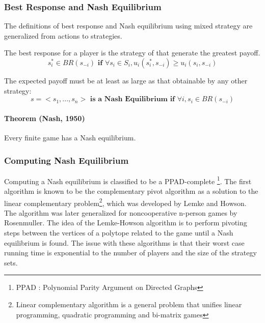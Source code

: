 \subsubsection{Best Response and Nash Equilibrium}The definitions of best response and Nash equilibrium using mixed strategy are generalized from actions to strategies. 
\begin{mydef}\label{def:def77} The best response for a player is the strategy of that generate the greatest payoff.
\begin{equation}\label{eq:111}
s_i^* \in BR(s_{-i}) \textbf{ if }   \forall s_i \in S_i, u_i(s_i^*,s_{-i}) \geq u_i(s_i, s_{-i})
\end{equation}
\end{mydef}
\begin{mydef}\label{def:def88} The expected payoff must be at least as large as that obtainable by any other strategy:
$$s = <s_1,...,s_n>\textbf{ is  a }\textbf{Nash Equilibrium if } \forall i, s_i \in BR(s_{-i})$$
\end{mydef}

\paragraph{Theorem (Nash, 1950)} Every finite game has a Nash equilibrium.

\subsubsection{Computing Nash Equilibrium}
Computing a Nash equilibrium is classified to be a PPAD-complete \footnote{PPAD : Polynomial Parity Argument on Directed Graphs}. The first algorithm is known to be the complementary pivot algorithm as a solution to the linear complementary problem\footnote{Linear complementary algorithm is a general problem that unifies linear programming, quadratic programming and bi-matrix games}, which was developed by Lemke and Howson. The algorithm was later generalized for noncooperative n-person games by  Rosenmuller. The idea of the Lemke-Howson algorithm is to perform pivoting steps between the vertices of a polytope related to the game until a Nash equilibrium is found. The issue with these algorithms is that their worst case running time is exponential to the number of players and the size of the strategy sets.
